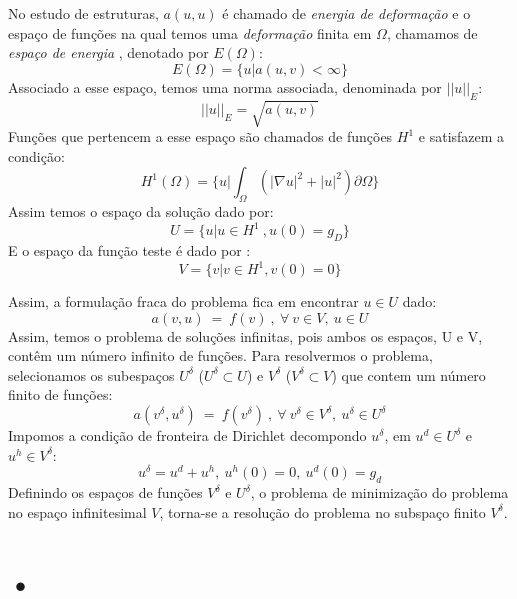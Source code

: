  No estudo de estruturas,  $a(u,u)$ é chamado de \emph{energia de deformação} e o espaço de funções na qual temos uma \emph{deformação} finita em $\Omega$, chamamos de \emph{espaço de energia} , denotado por $E(\Omega)$:
\begin{equation}
 E(\Omega) = \lbrace u | a(u,v) < \infty \rbrace
\end{equation}
  Associado a esse espaço, temos uma norma associada, denominada por $||u||_E$:
\begin{equation}
 ||u||_{E} = \sqrt{a(u,v)}
\end{equation}
 Funções que pertencem a esse espaço são chamados de funções $H^1$ e satisfazem a condição:
 \begin{equation}
 H^1(\Omega) = \bigg\{ u| \int_\Omega (|\nabla u|^2 + |u|^2) \partial \Omega  \bigg\}
 \end{equation}
  Assim temos o espaço da solução dado por:
\begin{equation}
U = \lbrace u| u \in H^1\ , u(0) = g_D  \rbrace
\end{equation}
 E o espaço da função teste é dado por :
\begin{equation}
V = \lbrace v | v \in H^1, v(0)=0 \rbrace
\end{equation}

 Assim, a formulação fraca do problema fica em encontrar $u \in U$ dado:
 \begin{equation}
 a(v,u)\ =\ f(v)\ ,\ \forall\ v \in V,\ u \in U
 \end{equation}
 Assim, temos o problema de soluções infinitas, pois ambos os espaços, U e V, contêm um número infinito de funções. Para resolvermos o problema, selecionamos os subespaços $U^\delta$ ($ U^\delta \subset U$) e $V^\delta$ ($ V^\delta \subset V$) que contem um número finito de funções:
  \begin{equation}
 a(v^\delta,u^\delta)\ =\ f(v^\delta)\ ,\ \forall\ v^\delta \in V^\delta,\ u^\delta \in U^\delta
 \end{equation}
Impomos a condição de fronteira de Dirichlet decompondo $u^\delta$, em $u^d \in U^\delta$ e $u^h \in V^\delta$:
\begin{equation}
 u^\delta = u^d + u^h,\ u^h(0) = 0,\ u^d(0) = g_d
\end{equation}
 Definindo os espaços de funções $V^\delta$ e $U^\delta$, o problema de minimização do problema no espaço infinitesimal $V$, torna-se a resolução do problema no subspaço finito $V^\delta$.
 
\section{•}
